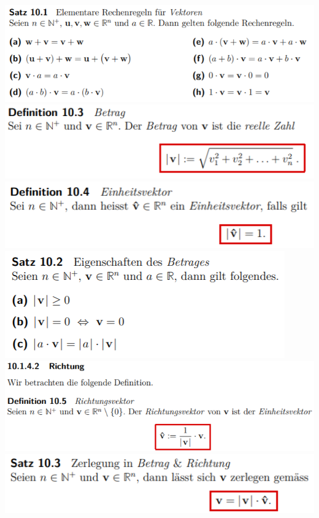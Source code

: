 \includegraphics[width=\columnwidth]{./images/vek3.png}
\includegraphics[width=\columnwidth]{./images/vek4.png}
\includegraphics[width=\columnwidth]{./images/vek5.png}
\includegraphics[width=\columnwidth]{./images/vek6.png}
\includegraphics[width=\columnwidth]{./images/vek7.png}
\includegraphics[width=\columnwidth]{./images/vek8.png}
